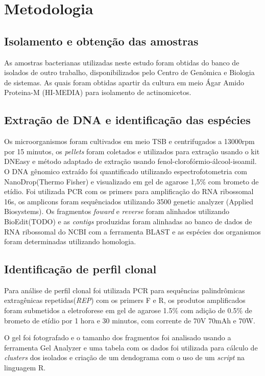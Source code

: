 \chapter{Metodologia}
\section{Isolamento e obtenção das amostras}
As amostras bacterianas utilizadas neste estudo foram obtidas do banco de isolados de outro
trabalho, disponibilizados pelo Centro de Genômica e Biologia de sistemas. As quais foram
obtidas apartir da cultura em meio Ágar Amido Proteina-M (HI-MEDIA) para isolamento de actinomicetos.

\section{Extração de DNA e identificação das espécies}
Os microorganismos foram cultivados em meio TSB e centrifugados a 13000rpm por 15 minutos,
os \textit{pellets} foram coletados e utilizados para extração usando o kit DNEasy e método
adaptado de extração usando  fenol-clorofórmio-álcool-isoamil. O DNA gênomico extraído
foi quantificado utilizando espectrofotometria com NanoDrop(Thermo Fisher) e visualizado
em gel de agarose 1,5\% com brometo de etídio. 
Foi utilizada PCR com os primers %
para amplificação do RNA ribossomal 16s, os amplicons foram sequênciados utilizando 3500 
genetic analyzer (Applied Biosystems). Os fragmentos \textit{foward} e \textit{reverse}
foram alinhados utilizando BioEdit(TODO) e as \textit{contigs} produzidas foram
alinhadas ao banco de dados de RNA ribossomal do NCBI com a ferramenta BLAST e as espécies
dos organismos foram determinadas utilizando homologia.  

\section{Identificação de perfil clonal}
Para análise de perfil clonal foi utilizada PCR para sequências palindrômicas
extragênicas repetidas(\textit{REP}) com os primers F e R, os produtos amplificados
foram submetidos a eletroforese em gel de agarose 1.5\% com adição de 0.5\% de
brometo de etídio por 1 hora e 30 minutos, com corrente de 70V 70mAh e 70W.

O gel foi fotografado e o tamanho dos fragmentos foi analisado usando a ferramenta
Gel Analyzer e uma tabela com os dados foi utilizada para cálculo de \textit{clusters}
dos isolados e criação de um dendograma com o uso de um \textit{script} na
linguagem R.

